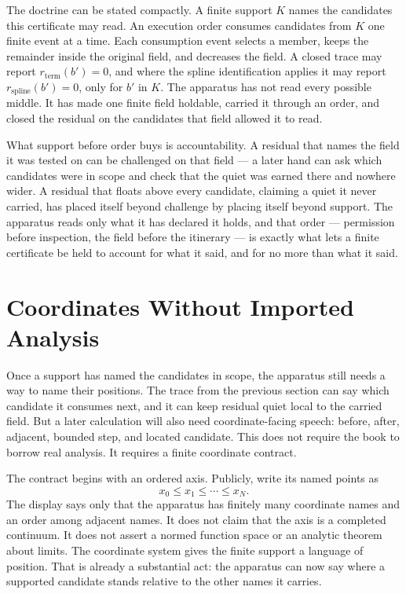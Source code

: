 The doctrine can be stated compactly. A finite support \(K\) names the
candidates this certificate may read. An execution order consumes candidates
from \(K\) one finite event at a time. Each consumption event selects a member,
keeps the remainder inside the original field, and decreases the field. A
closed trace may report \(r_{\mathrm{term}}(b')=0\), and where the spline
identification applies it may report \(r_{\mathrm{spline}}(b')=0\), only for
\(b'\) in \(K\). The apparatus has not read every possible middle. It has made one finite field holdable, carried it through an order, and closed the residual on the candidates that field allowed it to read.

What support before order buys is accountability. A residual that names the field it was tested on can be challenged on that field --- a later hand can ask which candidates were in scope and check that the quiet was earned there and nowhere wider. A residual that floats above every candidate, claiming a quiet it never carried, has placed itself beyond challenge by placing itself beyond support. The apparatus reads only what it has declared it holds, and that order --- permission before inspection, the field before the itinerary --- is exactly what lets a finite certificate be held to account for what it said, and for no more than what it said.

\section{Coordinates Without Imported Analysis}

Once a support has named the candidates in scope, the apparatus still needs a
way to name their positions. The trace from the previous section can say which
candidate it consumes next, and it can keep residual quiet local to the
carried field. But a later calculation will also need coordinate-facing
speech: before, after, adjacent, bounded step, and located candidate. This
does not require the book to borrow real analysis. It requires a finite
coordinate contract.

The contract begins with an ordered axis. Publicly, write its named points as
\[
  x_0 \le x_1 \le \cdots \le x_N .
\]
The display says only that the apparatus has finitely many coordinate names
and an order among adjacent names. It does not claim that the axis is a
completed continuum. It does not assert a normed function space or an
analytic theorem about limits. The coordinate system gives the finite support
a language of position. That is already a substantial act: the apparatus can
now say where a supported candidate stands relative to the other names it
carries.

